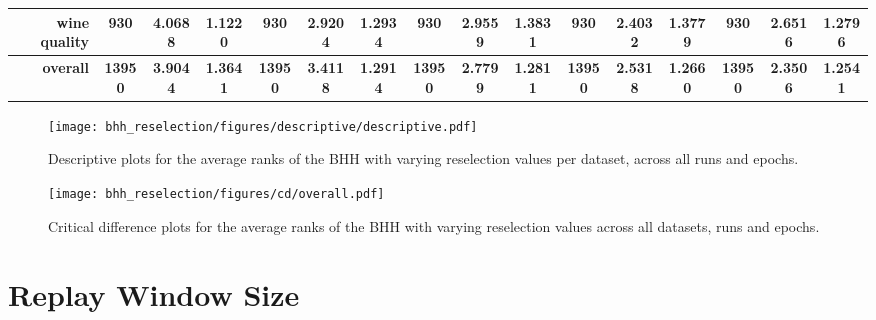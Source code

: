 \begin{table}[htbp]
{\begin{tabular}{rccccccccccccccc}
			wine quality                        & 930                                      & 4.0688                                                                    & 1.1220          & 930                            & 2.9204          & 1.2934          & 930                             & 2.9559          & 1.3831          & 930                             & \cellcolor[rgb]{ .776,  .937,  .808}\textcolor[rgb]{ 0,  .38,  0}{2.4032} & 1.3779          & 930                             & 2.6516                                                                             & 1.2796          \\
			\midrule
			\textbf{overall}                    & \textbf{13950}                           & \textbf{3.9044}                                                           & \textbf{1.3641} & \textbf{13950}                 & \textbf{3.4118} & \textbf{1.2914} & \textbf{13950}                  & \textbf{2.7799} & \textbf{1.2811} & \textbf{13950}                  & \textbf{2.5318}                                                           & \textbf{1.2660} & \textbf{13950}                  & \cellcolor[rgb]{ .776,  .937,  .808}\textcolor[rgb]{ 0,  .38,  0}{\textbf{2.3506}} & \textbf{1.2541} \\
		\end{tabular}%
	}
\end{table}%

\begin{figure}[htbp]
	\centering
	\texttt{[image: bhh\_reselection/figures/descriptive/descriptive.pdf]}
	\caption{Descriptive plots for the average ranks of the \acs{BHH} with varying reselection values per dataset, across all runs and epochs.}
	\label{fig:results:reselection:descriptive:descriptive}
\end{figure}

\begin{figure}[htbp]
	\centering
	\texttt{[image: bhh\_reselection/figures/cd/overall.pdf]}
	\caption{Critical difference plots for the average ranks of the \acs{BHH} with varying reselection values across all datasets, runs and epochs.}
	\label{fig:results:reselection:descriptive:cd}
\end{figure}


\section{Replay Window Size}\label{sec:results:bhh_variant_replay}

